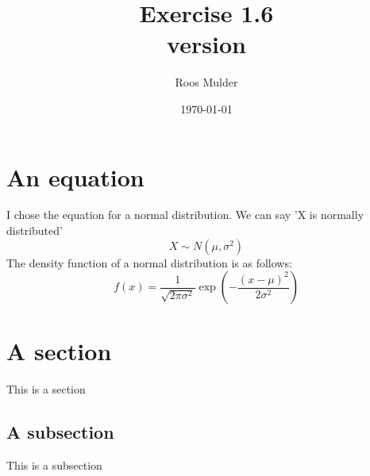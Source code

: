 \documentclass[10pt, a4paper, titlepage]{article}
\title{Exercise 1.6\\ \small \DIFdelbegin \DIFdel{first }\DIFdelend \DIFaddbegin \DIFadd{second }\DIFaddend version}
\author{Roos Mulder}
\date{\today}
\begin{document}
\maketitle
\newpage

\section*{An equation}
I chose the equation for a normal distribution. We can say 'X is normally distributed' 
\[
X \sim N(\mu, \sigma^2)
\]
The density function of a normal distribution is as follows:
\[
f(x) = \frac{1}{\sqrt{2\pi\sigma^2}}
       \exp\left(-\frac{(x-\mu)^2}{2\sigma^2}\right)
\]


\section*{A section}
This is a section

\subsection*{A subsection}
This is a subsection
\end{document}
